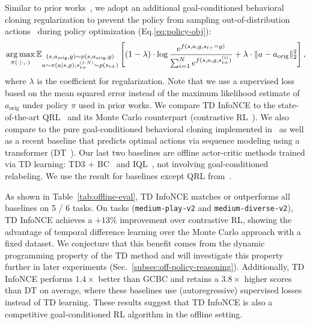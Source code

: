 \documentclass{article} %
\begin{document}
Similar to prior works~\citep{eysenbach2022contrastive, pmlr-v202-wang23al}, we adopt an additional goal-conditioned behavioral cloning regularization to prevent the policy from sampling out-of-distribution actions~\citep{fujimoto2021minimalist, kumar2020conservative, kumar2019stabilizing} during policy optimization (Eq.\ref{eq:policy-obj}):
\begin{align*}
    \operatorname*{arg\,max}_{\pi(\cdot \mid \cdot, \cdot)} \mathbb{E}_{\substack{ (s, a_{\text{orig}}, g) \sim p(s, a_{\text{orig}}, g) \\ a \sim \pi(a \mid s, g), s_{t+}^{(1:N)} \sim p(s_{t+}) }} \left[ (1 - \lambda) \cdot \log \frac{e^{f(s, a, g, s_{t+} = g )}}{ \sum_{i = 1}^N e^{ f(s, a, g, s_{t+}^{(i)}) } } + \lambda \cdot \|a - a_{\text{orig}}\|_2^2 \right],
\end{align*}
where $\lambda$ is the coefficient for regularization. Note that we use a supervised loss based on the mean squared error instead of the maximum likelihood estimate of $a_{\text{orig}}$ under policy $\pi$ used in prior works. We compare TD InfoNCE to the state-of-the-art QRL~\citep{pmlr-v202-wang23al} and its Monte Carlo counterpart (contrastive RL~\citep{eysenbach2022contrastive}). We also compare to the pure goal-conditioned behavioral cloning implemented in~\citep{emmons2021rvs} as well as a recent baseline that predicts optimal actions via sequence modeling using a transformer (DT~\citep{chen2021decision}). Our last two baselines are offline actor-critic methods trained via TD learning: TD3 + BC~\citep{fujimoto2021minimalist} and IQL~\citep{kostrikov2021offline}, not involving goal-conditioned relabeling. We use the result for baselines except QRL from~\citep{eysenbach2022contrastive}.

As shown in Table~\ref{tab:offline-eval}, TD InfoNCE matches or outperforms all baselines on 5 / 6 tasks. On tasks (\texttt{medium-play-v2} and \texttt{medium-diverse-v2}), TD InfoNCE achieves a $+13\%$ improvement over contrastive RL, showing the advantage of temporal difference learning over the Monte Carlo approach with a fixed dataset. We conjecture that this benefit comes from the dynamic programming property of the TD method and will investigate this property further in later experiments (Sec.~\ref{subsec:off-policy-reasoning}). Additionally, TD InfoNCE performs $1.4\times$ better than GCBC and retains a $3.8\times$ higher scores than DT on average, where these baselines use (autoregressive) supervised losses instead of TD learning. These results suggest that TD InfoNCE is also a competitive goal-conditioned RL algorithm in the offline setting.
\end{document}
